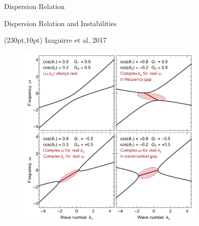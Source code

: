 \documentclass[9pt]{beamer}
\begin{document}
\begin{darkframes}
\begin{frame}{Dispersion Relation}







\end{frame}

\begin{frame}{Dispersion Relation and Instabilities}


    \begin{textblock*}{100pt}(230pt,10pt)
        Izaguirre et al, 2017
    \end{textblock*}

\begin{figure}
    \begin{tcolorbox}
        \color{white}
    \centering
    \includegraphics[width=0.8\textwidth]{assets/dr/dr-two-beams.png}
    \end{tcolorbox}

\end{figure}




\end{frame}
\end{darkframes}
\end{document}
